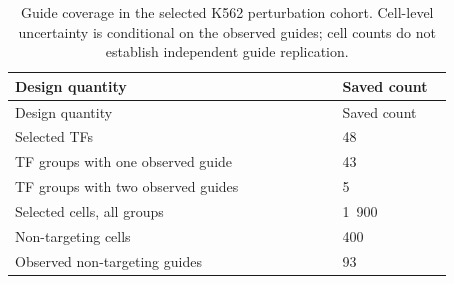 \begin{longtable}{@{}L{0.65\linewidth}L{0.22\linewidth}@{}}
\caption{Guide coverage in the selected K562 perturbation cohort. Cell-level uncertainty is conditional on the observed guides; cell counts do not establish independent guide replication.}\\
\toprule
Design quantity & Saved count \\
\midrule
\endfirsthead
\toprule
Design quantity & Saved count \\
\midrule
\endhead
\endfoot
\bottomrule
\endlastfoot
Selected TFs & 48 \\
TF groups with one observed guide & 43 \\
TF groups with two observed guides & 5 \\
Selected cells, all groups & 1~900 \\
Non-targeting cells & 400 \\
Observed non-targeting guides & 93 \\
\end{longtable}
